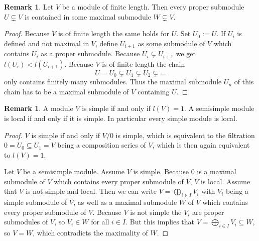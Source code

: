 \documentclass[a4paper,10pt]{article}
\theoremstyle{definition}
\newtheorem{rem}[own]{Remark}
\begin{document}
\begin{rem}\label{rem: all in maximal}
 Let $V$ be a module of finite length. Then every proper submodule $U \subsetneq V$ is contained in some maximal submodule $W \subsetneq V$.
\end{rem}
\begin{proof}
 Because $V$ is of finite length the same holds for $U$.
 Set $U_0 := U$. If $U_i$ is defined and not maximal in $V$, define $U_{i+1}$ as some submodule of $V$ which contains $U_i$ as a proper submodule. Because $U_i \subsetneq U_{i+1}$ we get $l(U_i) < l(U_{i+1})$.
 Because $V$ is of finite length the chain
 \[
  U = U_0 \subsetneq U_1 \subsetneq U_2 \subsetneq \ldots
 \]
 only contains finitely many submodules. Thus the maximal submodule $U_n$ of this chain has to be a maximal submodule of $V$ containing $U$.
\end{proof}

\begin{rem}\label{rem: simple len local}
 A module $V$ is simple if and only if $l(V) = 1$. A semisimple module is local if and only if it is simple. In particular every simple module is local.
\end{rem}
\begin{proof}
 $V$ is simple if and only if $V/0$ is simple, which is equivalent to the filtration $0 = U_0 \subseteq U_1 = V$ being a composition series of $V$, which is then again equivalent to $l(V)=1$.
 
 Let $V$ be a semisimple module.
 Assume $V$ is simple. Because $0$ is a maximal submodule of $V$ which contains every proper submodule of $V$, $V$ is local.
 Assume that $V$ is not simple and local. Then we can write $V = \bigoplus_{i \in I} V_i$ with $V_i$ being a simple submodule of $V$, as well as a maximal submodule $W$ of $V$ which contains every proper submodule of $V$. Because $V$ is not simple the $V_i$ are proper submodules of $V$, so $V_i \in W$ for all $i \in I$. But this implies that $V = \bigoplus_{i \in I} V_i \subseteq W$, so $V = W$, which contradicts the maximality of $W$.
\end{proof}
\end{document}
